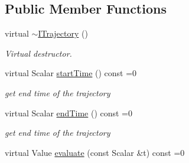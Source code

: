 \subsection*{Public Member Functions}
\begin{DoxyCompactItemize}
\item 
virtual \hyperlink{classow__core_1_1ITrajectory_a5fd03b27e0a404dcc03cecd0e26cb0e6}{$\sim$\+I\+Trajectory} ()\hypertarget{classow__core_1_1ITrajectory_a5fd03b27e0a404dcc03cecd0e26cb0e6}{}\label{classow__core_1_1ITrajectory_a5fd03b27e0a404dcc03cecd0e26cb0e6}

\begin{DoxyCompactList}\small\item\em Virtual destructor. \end{DoxyCompactList}\item 
virtual Scalar \hyperlink{classow__core_1_1ITrajectory_a51ce1503621b90178496afa3ef19f98a}{start\+Time} () const =0\hypertarget{classow__core_1_1ITrajectory_a51ce1503621b90178496afa3ef19f98a}{}\label{classow__core_1_1ITrajectory_a51ce1503621b90178496afa3ef19f98a}

\begin{DoxyCompactList}\small\item\em get end time of the trajectory \end{DoxyCompactList}\item 
virtual Scalar \hyperlink{classow__core_1_1ITrajectory_a951d422f6adf14a6bbf0a9806473e187}{end\+Time} () const =0\hypertarget{classow__core_1_1ITrajectory_a951d422f6adf14a6bbf0a9806473e187}{}\label{classow__core_1_1ITrajectory_a951d422f6adf14a6bbf0a9806473e187}

\begin{DoxyCompactList}\small\item\em get end time of the trajectory \end{DoxyCompactList}\item 
virtual Value \hyperlink{classow__core_1_1ITrajectory_accc6ac3c21e85d796b07048e8bab5c7c}{evaluate} (const Scalar \&t) const =0\hypertarget{classow__core_1_1ITrajectory_accc6ac3c21e85d796b07048e8bab5c7c}{}\label{classow__core_1_1ITrajectory_accc6ac3c21e85d796b07048e8bab5c7c}


\end{DoxyCompactItemize}
